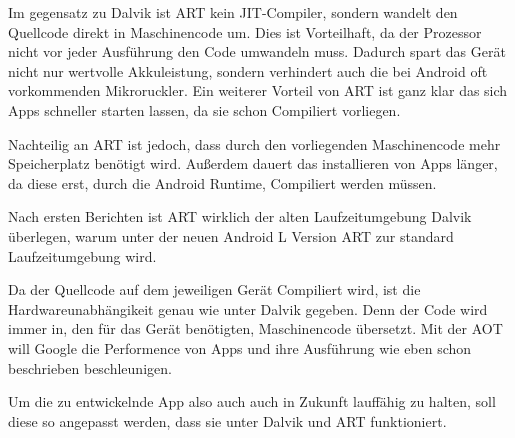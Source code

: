 Im gegensatz zu Dalvik ist \ac{ART} kein \ac{JIT}-Compiler, sondern wandelt den Quellcode direkt in Maschinencode um. Dies ist Vorteilhaft, da der Prozessor nicht vor jeder Ausf\"uhrung den Code umwandeln muss. Dadurch spart das Ger\"at nicht nur wertvolle Akkuleistung, sondern verhindert auch die bei Android oft vorkommenden Mikroruckler. 
Ein weiterer Vorteil von \ac{ART} ist ganz klar das sich Apps schneller starten lassen, da sie schon Compiliert vorliegen.

Nachteilig an \ac{ART} ist jedoch, dass durch den vorliegenden Maschinencode mehr Speicherplatz ben\"otigt wird. Au\ss{}erdem dauert das installieren von Apps l\"anger, da diese erst, durch die Android Runtime, Compiliert werden m\"ussen. \cite{NextART} \cite{AreamobileART}

Nach ersten Berichten ist \ac{ART} wirklich der alten Laufzeitumgebung Dalvik \"uberlegen, warum unter der neuen Android L Version \ac{ART} zur standard Laufzeitumgebung wird. \cite{DevART} 

Da der Quellcode auf dem jeweiligen Ger\"at Compiliert wird, ist die Hardwareunabh\"angikeit genau wie unter Dalvik gegeben. Denn der Code wird immer in, den f\"ur das Ger\"at ben\"otigten, Maschinencode \"ubersetzt. Mit der \ac{AOT} will Google die Performence von Apps und ihre Ausf\"uhrung wie eben schon beschrieben beschleunigen.

Um die zu entwickelnde App also auch auch in Zukunft lauff\"ahig zu halten, soll diese so angepasst werden, dass sie unter Dalvik und \ac{ART} funktioniert.
